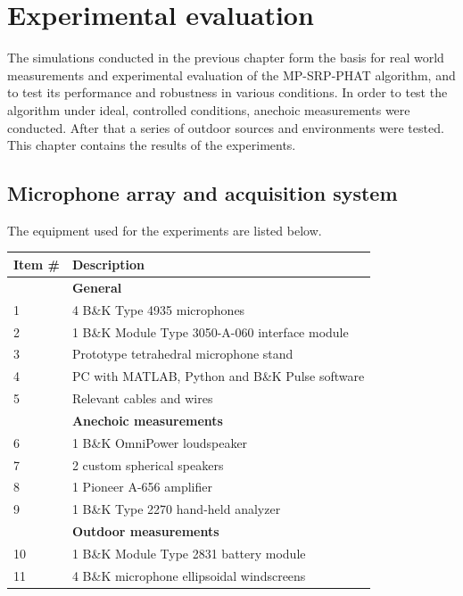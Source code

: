 \chapter{Experimental evaluation} \label{sec:experimentsoutside}
The simulations conducted in the previous chapter form the basis for real world measurements and experimental evaluation of the MP-SRP-PHAT algorithm, and to test its performance and robustness in various conditions. In order to test the algorithm under ideal, controlled conditions, anechoic measurements were conducted. After that a series of outdoor sources and environments were tested. This chapter contains the results of the experiments. 

\section{Microphone array and acquisition system}
The equipment used for the experiments are listed below.
\begin{table}[!ht]
    \centering
	\begin{tabular}{ll} \toprule
	{Item \#}	&	{Description}\\
	    \bottomrule 
	        &   \textbf{{General}}                                       \\
	    1   &   4 B\&K  Type 4935 microphones                            \\
	    2   &   1 B\&K Module Type 3050-A-060 interface module           \\
	    3   &   Prototype tetrahedral microphone stand                   \\
		4   &   PC with MATLAB, Python and B\&K Pulse software           \\
		5   &   Relevant cables and wires                                \\
		\bottomrule 
            &  \textbf{{Anechoic measurements}}                           \\
		6	&   1 B\&K OmniPower loudspeaker                              \\
		7   &   2 custom spherical speakers                               \\
		8   &   1 Pioneer A-656 amplifier                                 \\
		9   &   1 B\&K Type 2270 hand-held analyzer                       \\
		\bottomrule 
		    &   \textbf{{Outdoor measurements}}                           \\
		10  &   1 B\&K Module Type 2831 battery module                    \\
		11  &   4 B\&K microphone ellipsoidal windscreens                  \\
		\bottomrule 
	\end{tabular}
\end{table}
